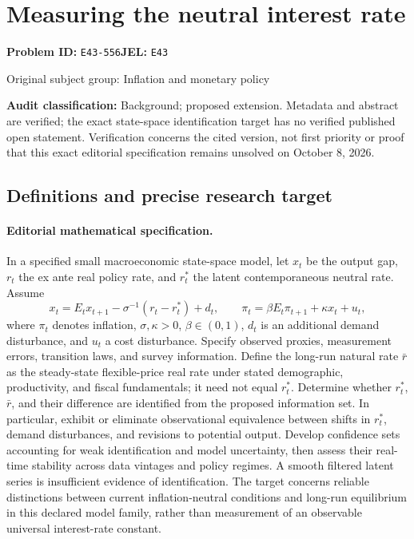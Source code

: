 \documentclass[11pt,a4paper]{article}
\begin{document}
\section*{Measuring the neutral interest rate}
\textbf{Problem ID:} \texttt{E43-556}\quad \textbf{JEL:} \texttt{E43}\par
\label{problem:OP-0245}
{\sffamily\small\color{muted}Original subject group: Inflation and monetary policy\par}
\label{definitions:problem:30007526}
\textbf{Audit classification:} Background; proposed extension. Metadata and abstract are verified; the exact state-space identification target has no verified published open statement. Verification concerns the cited version, not first priority or proof that this exact editorial specification remains unsolved on October 8, 2026.
\subsection*{Definitions and precise research target}
\paragraph{Editorial mathematical specification.} In a specified small macroeconomic state-space model, let \(x_t\) be the output gap, \(r_t\) the ex ante real policy rate, and \(r_t^*\) the latent contemporaneous neutral rate. Assume
\[
x_t=E_tx_{t+1}-\sigma^{-1}(r_t-r_t^*)+d_t,\qquad
\pi_t=\beta E_t\pi_{t+1}+\kappa x_t+u_t,
\]
where \(\pi_t\) denotes inflation, \(\sigma,\kappa>0\), \(\beta\in(0,1)\), \(d_t\) is an additional demand disturbance, and \(u_t\) a cost disturbance. Specify observed proxies, measurement errors, transition laws, and survey information. Define the long-run natural rate \(\bar r\) as the steady-state flexible-price real rate under stated demographic, productivity, and fiscal fundamentals; it need not equal \(r_t^*\).
Determine whether \(r_t^*\), \(\bar r\), and their difference are identified from the proposed information set. In particular, exhibit or eliminate observational equivalence between shifts in \(r_t^*\), demand disturbances, and revisions to potential output. Develop confidence sets accounting for weak identification and model uncertainty, then assess their real-time stability across data vintages and policy regimes. A smooth filtered latent series is insufficient evidence of identification. The target concerns reliable distinctions between current inflation-neutral conditions and long-run equilibrium in this declared model family, rather than measurement of an observable universal interest-rate constant.
\end{document}

